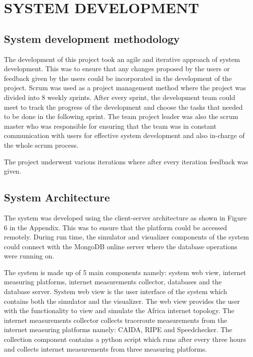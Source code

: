 \section{SYSTEM DEVELOPMENT}\label{sec:system-development}
\subsection{System development methodology}\label{subsec:implementation-and-ui-design}
The development of this project took an agile and iterative approach of system development. This was to ensure that any changes proposed by the users or feedback given by the users could be incorporated in the development of the project.  Scrum was used as a project management method where the project was divided into 8 weekly sprints. After every sprint, the development team could meet to track the progress of  the development and choose the tasks that needed to be done in the following sprint.  The team project leader was also the scrum master who was responsible for ensuring that the team was in constant communication with users for effective system development and also in-charge of the whole scrum process. 

The project underwent various iterations where after every iteration feedback was given. 
\subsection{System Architecture}\label{subsec:system architecture}
The system was developed using the client-server architecture as shown in Figure 6 in the Appendix. This was to ensure that the platform could be accessed remotely. During run time, the simulator and visualizer components of the system could connect with the MongoDB online server where the database operations were running on. 

The system is made up of 5 main components namely: system web view, internet measuring platforms, internet measurements collector, databases and the database server. System web view is the user interface of the system which contains both the simulator and the visualizer. The web view provides the user with the functionality to view and simulate the Africa internet topology. The internet measurements collector collects traceroute measurements from the internet measuring platforms namely: CAIDA, RIPE and Speedchecker. The collection component contains a python script which runs after every three hours and collects internet measurements from three measuring platforms. 

